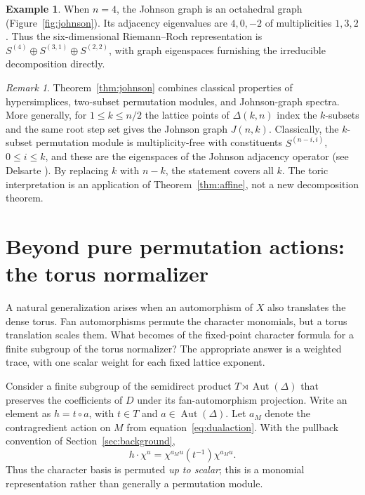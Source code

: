 \documentclass[12pt,letterpaper]{article}
\theoremstyle{definition}
\newtheorem{example}[theorem]{Example}
\theoremstyle{remark}
\newtheorem{remark}[theorem]{Remark}
\numberwithin{equation}{section}
\DeclareMathOperator{\Aut}{Aut}
\begin{document}
\begin{example}\label{ex:n4}
When $n=4$, the Johnson graph is an octahedral graph (Figure~\ref{fig:johnson}). Its adjacency eigenvalues are $4,0,-2$ of multiplicities $1,3,2$. Thus the six-dimensional Riemann--Roch representation is $S^{(4)}\oplus S^{(3,1)}\oplus S^{(2,2)}$, with graph eigenspaces furnishing the irreducible decomposition directly.
\end{example}

\begin{remark}
Theorem~\ref{thm:johnson} combines classical properties of hypersimplices, two-subset permutation modules, and Johnson-graph spectra. More generally, for $1\leq k\leq n/2$ the lattice points of $\Delta(k,n)$ index the $k$-subsets and the same root step set gives the Johnson graph $J(n,k)$. Classically, the $k$-subset permutation module is multiplicity-free with constituents $S^{(n-i,i)}$, $0\leq i\leq k$, and these are the eigenspaces of the Johnson adjacency operator (see Delsarte \cite{De73}). By replacing $k$ with $n-k$, the statement covers all $k$. The toric interpretation is an application of Theorem~\ref{thm:affine}, not a new decomposition theorem.
\end{remark}

\section{Beyond pure permutation actions: the torus normalizer}\label{sec:normalizer}
A natural generalization arises when an automorphism of $X$ also translates the dense torus. Fan automorphisms permute the character monomials, but a torus translation scales them. What becomes of the fixed-point character formula for a finite subgroup of the torus normalizer? The appropriate answer is a weighted trace, with one scalar weight for each fixed lattice exponent.

Consider a finite subgroup of the semidirect product $T\rtimes\Aut(\Delta)$ that preserves the coefficients of $D$ under its fan-automorphism projection. Write an element as $h=t\circ a$, with $t\in T$ and $a\in\Aut(\Delta)$. Let $a_M$ denote the contragredient action on $M$ from equation~\eqref{eq:dualaction}. With the pullback convention of Section~\ref{sec:background},
\begin{equation}\label{eq:normalizer}
h\cdot\chi^u=\chi^{a_Mu}(t^{-1})\chi^{a_Mu}.
\end{equation}
Thus the character basis is permuted \emph{up to scalar}; this is a monomial representation rather than generally a permutation module.
\end{document}
